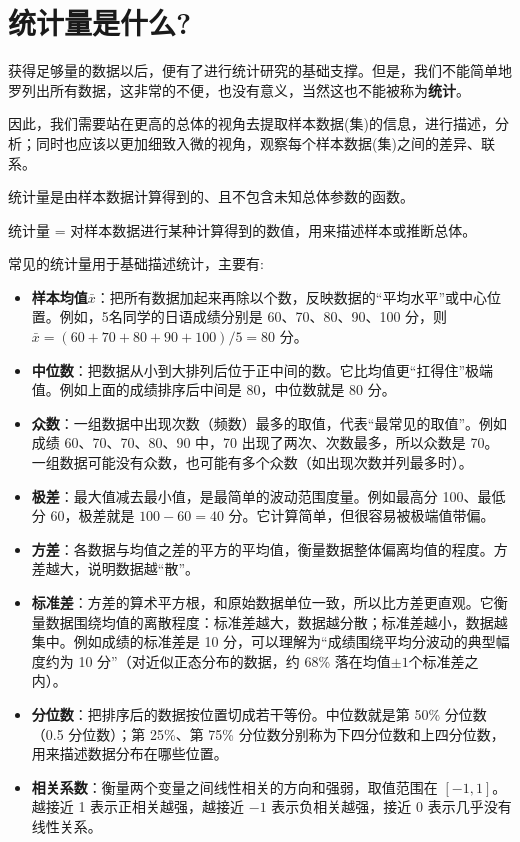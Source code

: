 \documentclass[lang=cn,10pt]{elegantbook}
\begin{document}
\section{统计量是什么?}
获得足够量的数据以后，便有了进行统计研究的基础支撑。但是，我们不能简单地罗列出所有数据，这非常的不便，也没有意义，当然这也不能被称为\textbf{统计}。

因此，我们需要站在更高的总体的视角去提取样本数据(集)的信息，进行描述，分析；同时也应该以更加细致入微的视角，观察每个样本数据(集)之间的差异、联系。
\begin{definition}[统计量] 
统计量是由样本数据计算得到的、且不包含未知总体参数的函数。

统计量 = 对样本数据进行某种计算得到的数值，用来描述样本或推断总体。
\end{definition}

常见的统计量用于基础描述统计，主要有:
\begin{itemize}
  \item \textbf{样本均值}$\bar{x}$：把所有数据加起来再除以个数，反映数据的“平均水平”或中心位置。例如，5名同学的日语成绩分别是 60、70、80、90、100 分，则 $\bar{x}=(60+70+80+90+100)/5=80$ 分。
  \item \textbf{中位数}：把数据从小到大排列后位于正中间的数。它比均值更“扛得住”极端值。例如上面的成绩排序后中间是 80，中位数就是 80 分。
  \item \textbf{众数}：一组数据中出现次数（频数）最多的取值，代表“最常见的取值”。例如成绩 60、70、70、80、90 中，70 出现了两次、次数最多，所以众数是 70。一组数据可能没有众数，也可能有多个众数（如出现次数并列最多时）。
  \item \textbf{极差}：最大值减去最小值，是最简单的波动范围度量。例如最高分 100、最低分 60，极差就是 $100-60=40$ 分。它计算简单，但很容易被极端值带偏。
  \item \textbf{方差}：各数据与均值之差的平方的平均值，衡量数据整体偏离均值的程度。方差越大，说明数据越“散”。
  \item \textbf{标准差}：方差的算术平方根，和原始数据单位一致，所以比方差更直观。它衡量数据围绕均值的离散程度：标准差越大，数据越分散；标准差越小，数据越集中。例如成绩的标准差是 10 分，可以理解为“成绩围绕平均分波动的典型幅度约为 10 分”（对近似正态分布的数据，约 68\% 落在均值$\pm 1$个标准差之内）。
  \item \textbf{分位数}：把排序后的数据按位置切成若干等份。中位数就是第 50\% 分位数（0.5 分位数）；第 25\%、第 75\% 分位数分别称为下四分位数和上四分位数，用来描述数据分布在哪些位置。
  \item \textbf{相关系数}：衡量两个变量之间线性相关的方向和强弱，取值范围在 $[-1,1]$。越接近 1 表示正相关越强，越接近 $-1$ 表示负相关越强，接近 0 表示几乎没有线性关系。
\end{itemize}
\end{document}

